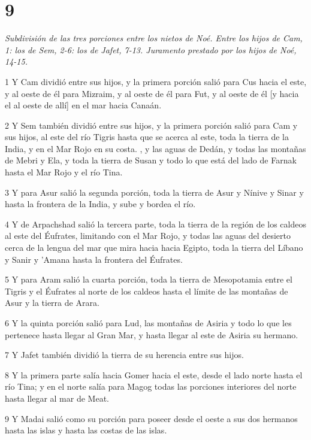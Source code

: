\chapter{9}

\par \textit{Subdivisión de las tres porciones entre los nietos de Noé. Entre los hijos de Cam, 1: los de Sem, 2-6: los de Jafet, 7-13. Juramento prestado por los hijos de Noé, 14-15.}

\par 1 Y Cam dividió entre sus hijos, y la primera porción salió para Cus hacia el este, y al oeste de él para Mizraim, y al oeste de él para Fut, y al oeste de él [y hacia el al oeste de allí] en el mar hacia Canaán.
\par 2 Y Sem también dividió entre sus hijos, y la primera porción salió para Cam y sus hijos, al este del río Tigris hasta que se acerca al este, toda la tierra de la India, y en el Mar Rojo en su costa. , y las aguas de Dedán, y todas las montañas de Mebri y Ela, y toda la tierra de Susan y todo lo que está del lado de Farnak hasta el Mar Rojo y el río Tina.
\par 3 Y para Asur salió la segunda porción, toda la tierra de Asur y Nínive y Sinar y hasta la frontera de la India, y sube y bordea el río.
\par 4 Y de Arpachshad salió la tercera parte, toda la tierra de la región de los caldeos al este del Éufrates, limitando con el Mar Rojo, y todas las aguas del desierto cerca de la lengua del mar que mira hacia hacia Egipto, toda la tierra del Líbano y Sanir y 'Amana hasta la frontera del Éufrates.
\par 5 Y para Aram salió la cuarta porción, toda la tierra de Mesopotamia entre el Tigris y el Éufrates al norte de los caldeos hasta el límite de las montañas de Asur y la tierra de Arara.
\par 6 Y la quinta porción salió para Lud, las montañas de Asiria y todo lo que les pertenece hasta llegar al Gran Mar, y hasta llegar al este de Asiria su hermano.
\par 7 Y Jafet también dividió la tierra de su herencia entre sus hijos.
\par 8 Y la primera parte salía hacia Gomer hacia el este, desde el lado norte hasta el río Tina; y en el norte salía para Magog todas las porciones interiores del norte hasta llegar al mar de Meat.
\par 9 Y Madai salió como su porción para poseer desde el oeste a sus dos hermanos hasta las islas y hasta las costas de las islas.
